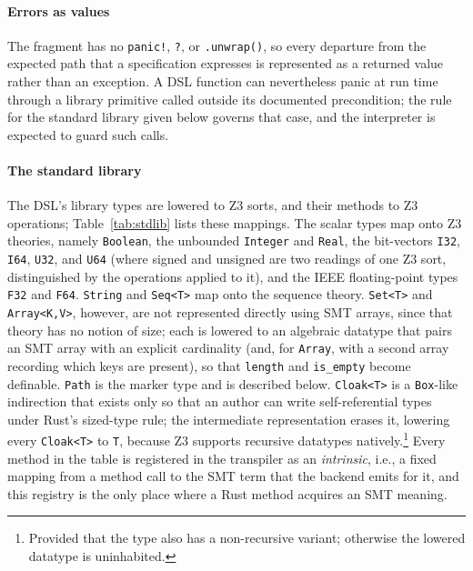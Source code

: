 \documentclass[sigconf,screen]{acmart}
\theoremstyle{definition}
\theoremstyle{remark}
\newcommand{\code}[1]{\texttt{#1}}
\begin{document}
\paragraph{Errors as values}
The fragment has no \code{panic!}, \code{?}, or \code{.unwrap()}, so every
departure from the expected path that a specification expresses is represented as a returned value rather than an exception. A DSL function can nevertheless panic at run time through a library primitive called outside its documented precondition; the rule for the standard library given below governs that case, and the interpreter is expected to guard such calls.

\paragraph{The standard library}
The DSL's library types are lowered to Z3 sorts, and their methods to Z3 operations; Table~\ref{tab:stdlib} lists these mappings. 
The scalar types map onto Z3
theories, namely \code{Boolean}, the unbounded \code{Integer} and \code{Real},
the bit-vectors \code{I32}, \code{I64}, \code{U32}, and \code{U64} (where signed
and unsigned are two readings of one Z3 sort, distinguished by the operations
applied to it), and the IEEE floating-point types \code{F32} and \code{F64}.
\code{String} and \code{Seq<T>} map onto the sequence theory. \code{Set<T>} and
\code{Array<K,V>}, however, are not represented directly using SMT arrays, since that
theory has no notion of size; each is lowered to an algebraic datatype that pairs
an SMT array with an explicit cardinality (and, for \code{Array}, with a second
array recording which keys are present), so that \code{length} and
\code{is\_empty} become definable. \code{Path} is the marker type and is
described below. \code{Cloak<T>} is a \code{Box}-like indirection that exists
only so that an author can write self-referential types under Rust's sized-type rule; the intermediate representation erases
it, lowering every \code{Cloak<T>} to \code{T}, because Z3 supports recursive
datatypes natively.\footnote{Provided that the type also has a non-recursive
variant; otherwise the lowered datatype is uninhabited.} Every method in the
table is registered in the transpiler as an \emph{intrinsic}, i.e., a fixed
mapping from a method call to the SMT term that the backend emits for it, and
this registry is the only place where a Rust method acquires an SMT meaning.
\end{document}
